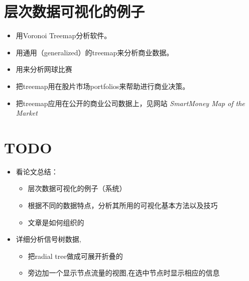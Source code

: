 \documentclass{article}
\begin{document}
\section{层次数据可视化的例子}
\begin{itemize}
	\item \cite{balzer2005voronoi}用Voronoi Treemap\cite{Balzer_voronoitreemaps}分析软件。
	\item \cite{vliegen2006visualizing}用通用（generalized）的treemap来分析商业数据。
	\item \cite{jin1997tennisviewer}用来分析网球比赛
	\item \cite{jungmeister1992adapting}把treemap用在股片市场portfolios来帮助进行商业决策。
	\item \cite{wattenberg1999visualizing}把treemap应用在公开的商业公司数据上，见网站
		\emph{SmartMoney Map of the Market}
\end{itemize}

\section{TODO}
\begin{itemize}
	\item 看论文总结：
		\begin{itemize}
			\item 层次数据可视化的例子（系统）
			\item 根据不同的数据特点，分析其所用的可视化基本方法以及技巧
			\item 文章是如何组织的
		\end{itemize}
	\item 详细分析信号树数据,
		\begin{itemize}
			\item 把radial tree做成可展开折叠的
			\item 旁边加一个显示节点流量的视图,在选中节点时显示相应的信息 
		\end{itemize}
\end{itemize}


\end{document}
